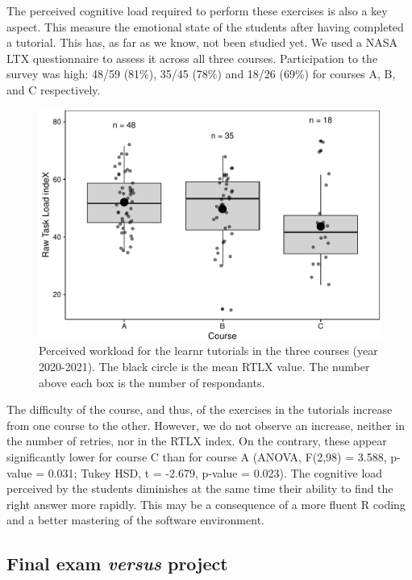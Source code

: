 \documentclass[
]{article}
\begin{document}
The perceived cognitive load required to perform these exercises is also
a key aspect. This measure the emotional state of the students after
having completed a tutorial. This has, as far as we know, not been
studied yet. We used a NASA LTX questionnaire to assess it across all
three courses. Participation to the survey was high: 48/59 (81\%), 35/45
(78\%) and 18/26 (69\%) for courses A, B, and C respectively.

\begin{figure}
\centering
\includegraphics{teaching_data_science_files/figure-latex/fig_rtlx-1.pdf}
\caption{Perceived workload for the learnr tutorials in the three
courses (year 2020-2021). The black circle is the mean RTLX value. The
number above each box is the number of respondants.}
\end{figure}

The difficulty of the course, and thus, of the exercises in the
tutorials increase from one course to the other. However, we do not
observe an increase, neither in the number of retries, nor in the RTLX
index. On the contrary, these appear significantly lower for course C
than for course A (ANOVA, F(2,98) = 3.588, p-value = 0.031; Tukey HSD, t
= -2.679, p-value = 0.023). The cognitive load perceived by the students
diminishes at the same time their ability to find the right answer more
rapidly. This may be a consequence of a more fluent R coding and a
better mastering of the software environment.

\hypertarget{final-exam-versus-project}{%
\subsection{\texorpdfstring{Final exam \emph{versus}
project}{Final exam versus project}}\label{final-exam-versus-project}}
\end{document}
